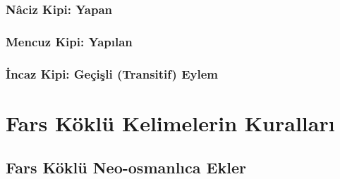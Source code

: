 \documentclass[a5paper,11pt, DIV11]{scrbook}
\begin{document}
\subsection{Nâciz Kipi: Yapan}

\subsection{Mencuz Kipi: Yapılan}

\subsection{İncaz Kipi: Geçişli (Transitif) Eylem}


\chapter{Fars Köklü Kelimelerin Kuralları}
\section{Fars Köklü Neo-osmanlıca Ekler}


\end{document}
